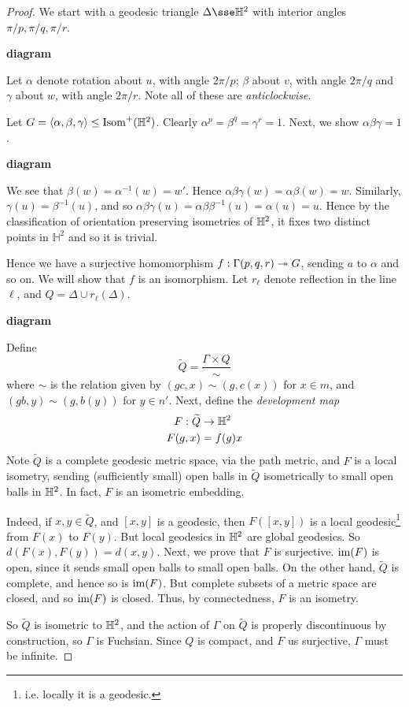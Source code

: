 \documentclass{article}
\begin{document}
\begin{proof}
    We start with a geodesic triangle \(\Delta \sse \bb H^2\) with interior angles \(\pi/p, \pi/q, \pi/r\).

\lec

    \textbf{diagram}

    Let \(\alpha\) denote rotation about \(u\), with angle \(2\pi/p\); \(\beta\) about \(v\), with angle \(2\pi/q\) and \(\gamma\) about \(w\), with angle \(2\pi/r\). Note all of these are \emph{anticlockwise}.

    Let \(G = \left\langle \alpha, \beta,\gamma \right\rangle \le \operatorname{Isom}^+(\mathbb{H}^2)\). Clearly \(\alpha^p = \beta^q = \gamma^r = 1\). Next, we show \(\alpha\beta\gamma = 1\).

    \textbf{diagram}

    We see that \(\beta(w) = \alpha^{-1}(w) = w'\). Hence \(\alpha\beta\gamma(w) = \alpha\beta(w) = w\). Similarly, \(\gamma(u) = \beta^{-1}(u)\), and so \(\alpha\beta\gamma(u) = \alpha\beta\beta^{-1}(u) = \alpha(u) = u\). Hence by the classification of orientation preserving isometries of \(\mathbb{H}^2\), it fixes two distinct points in \(\mathbb H^2\) and so it is trivial.

    Hence we have a surjective homomorphism \(f : \Gamma(p, q, r) \twoheadrightarrow G\), sending \(a\) to \(\alpha\) and so on. We will show that \(f\) is an isomorphism. Let \(r_\ell\) denote reflection in the line \(\ell\), and \(Q = \Delta \cup r_\ell(\Delta)\).

    \textbf{diagram}

    Define
    \[\widetilde Q  = \frac{\Gamma \times Q}{\sim}\]
    where \(\sim\) is the relation given by \((gc, x) \sim (g, c(x))\) for \(x \in m\), and \((gb, y) \sim (g, b(y))\) for \(y \in n'\). Next, define the \emph{development map}
    \begin{align*}
        F : \widetilde Q &\to \mathbb{H}^2 \\
        F(g, x) &= f(g)x
    \end{align*}
    Note \(\widetilde Q\) is a complete geodesic metric space, via the path metric, and \(F\) is a local isometry, sending (sufficiently small) open balls in \(\widetilde Q\) isometrically to small open balls in \(\mathbb{H}^2\). In fact, \(F\) is an isometric embedding.

    Indeed, if \(x, y \in \widetilde Q\), and \([x, y]\) is a geodesic, then \(F([x, y])\) is a local geodesic\footnote{i.e. locally it is a geodesic.} from \(F(x)\) to \(F(y)\). But local geodesics in \(\mathbb{H}^2\) are global geodesics. So \(d(F(x), F(y)) = d(x, y)\). Next, we prove that \(F\) is surjective. \(\operatorname{im}(F)\) is open, since it sends small open balls to small open balls. On the other hand, \(\widetilde Q\) is complete, and hence so is \(\operatorname{im}(F)\). But complete subsets of a metric space are closed, and so \(\operatorname{im}(F)\) is closed. Thus, by connectedness, \(F\) is an isometry.

    So \(\widetilde Q\) is isometric to \(\mathbb{H}^2\), and the action of \(\Gamma\) on \(\widetilde Q\) is properly discontinuous by construction, so \(\Gamma\) is Fuchsian. Since \(Q\) is compact, and \(F\) us surjective, \(\Gamma\) must be infinite.
\end{proof}
\end{document}

